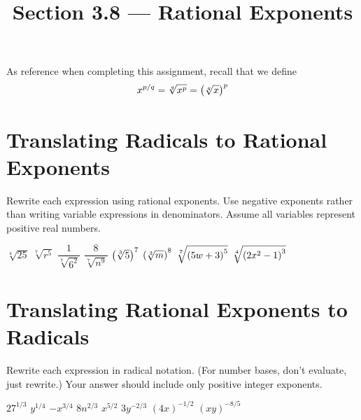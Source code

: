 

\title{Section 3.8 --- Rational Exponents}


\maketitle

As reference when completing this assignment, recall that we define
$$x^{p/q}=\sqrt[q]{x^p}=\left(\sqrt[q]{x}\right)^p$$

\section*{Translating Radicals to Rational Exponents}
Rewrite each expression using rational exponents.  Use negative exponents rather than writing variable expressions in denominators.  Assume all variables represent positive real numbers.
\begin{smenum}
\mitemxxxx
{$\sqrt[4]{25}$}
{$\sqrt[7]{r^5}$}
{$\dfrac{1}{\sqrt[7]{6^2}}$}
{$\dfrac{8}{\sqrt[7]{n^9}}$}
\mitemxxxx
{$\left(\sqrt[3]{5}\right)^7$}
{$\left(\sqrt[3]{m}\right)^8$}
{$\sqrt[7]{\left(5w+3\right)^5}$}
{$\sqrt[4]{\left(2x^2-1\right)^3}$}

\end{smenum}

\section*{Translating Rational Exponents to Radicals}
Rewrite each expression in radical notation. (For number bases, don't evaluate, just rewrite.) Your answer should include only positive integer exponents.
\begin{smenum}
\mitemxxxx
{$27^{1/3}$}
{$y^{1/4}$}
{$-x^{3/4}$}
{$8n^{2/3}$}
\mitemxxxx
{$x^{5/2}$}
{$3y^{-2/3}$}
{$(4x)^{-1/2}$}
{$(xy)^{-8/5}$}
\end{smenum}


